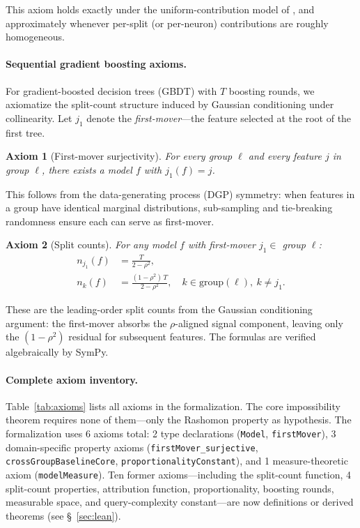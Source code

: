 \documentclass{article}
\newtheorem{axiom}{Axiom}
\newcommand{\GBDT}{\textsc{GBDT}}
\begin{document}
This axiom holds exactly under the uniform-contribution model of \citep{lundberg2017unified}, and approximately whenever per-split (or per-neuron) contributions are roughly homogeneous.

\paragraph{Sequential gradient boosting axioms.}
For gradient-boosted decision trees (\GBDT{}) with $T$ boosting rounds, we axiomatize the split-count structure induced by Gaussian conditioning under collinearity.
Let $j_1$ denote the \emph{first-mover}---the feature selected at the root of the first tree.

\begin{axiom}[First-mover surjectivity]
\label{ax:surjective}
For every group $\ell$ and every feature $j$ in group $\ell$, there exists a model $f$ with $j_1(f) = j$.
\end{axiom}

This follows from the data-generating process (DGP) symmetry: when features in a group have identical marginal distributions, sub-sampling and tie-breaking randomness ensure each can serve as first-mover.

\begin{axiom}[Split counts]
\label{ax:splits}
For any model $f$ with first-mover $j_1 \in$ group $\ell$:
\begin{align}
    n_{j_1}(f) &= \frac{T}{2 - \rho^2}, \label{eq:splits-first} \\
    n_{k}(f) &= \frac{(1-\rho^2)\,T}{2 - \rho^2}, \quad k \in \text{group}(\ell),\ k \neq j_1. \label{eq:splits-other}
\end{align}
\end{axiom}

These are the leading-order split counts from the Gaussian conditioning argument: the first-mover absorbs the $\rho$-aligned signal component, leaving only the $(1-\rho^2)$ residual for subsequent features.
The formulas are verified algebraically by SymPy.

\paragraph{Complete axiom inventory.}
Table~\ref{tab:axioms} lists all axioms in the formalization.
The core impossibility theorem requires none of them---only the Rashomon property as hypothesis.
The formalization uses 6 axioms total: 2 type declarations (\texttt{Model}, \texttt{firstMover}), 3 domain-specific property axioms (\texttt{firstMover\_surjective}, \texttt{crossGroupBaselineCore}, \texttt{proportionalityConstant}), and 1 measure-theoretic axiom (\texttt{modelMeasure}).
Ten former axioms---including the split-count function, 4 split-count properties, attribution function, proportionality, boosting rounds, measurable space, and query-complexity constant---are now definitions or derived theorems (see \S~\ref{sec:lean}).
\end{document}
